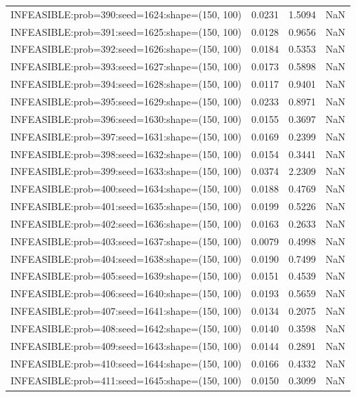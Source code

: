 \begin{longtable}{lccc}
INFEASIBLE:prob=390:seed=1624:shape=(150, 100) &   0.0231 &  1.5094 &    NaN \\
INFEASIBLE:prob=391:seed=1625:shape=(150, 100) &   0.0128 &  0.9656 &    NaN \\
INFEASIBLE:prob=392:seed=1626:shape=(150, 100) &   0.0184 &  0.5353 &    NaN \\
INFEASIBLE:prob=393:seed=1627:shape=(150, 100) &   0.0173 &  0.5898 &    NaN \\
INFEASIBLE:prob=394:seed=1628:shape=(150, 100) &   0.0117 &  0.9401 &    NaN \\
INFEASIBLE:prob=395:seed=1629:shape=(150, 100) &   0.0233 &  0.8971 &    NaN \\
INFEASIBLE:prob=396:seed=1630:shape=(150, 100) &   0.0155 &  0.3697 &    NaN \\
INFEASIBLE:prob=397:seed=1631:shape=(150, 100) &   0.0169 &  0.2399 &    NaN \\
INFEASIBLE:prob=398:seed=1632:shape=(150, 100) &   0.0154 &  0.3441 &    NaN \\
INFEASIBLE:prob=399:seed=1633:shape=(150, 100) &   0.0374 &  2.2309 &    NaN \\
INFEASIBLE:prob=400:seed=1634:shape=(150, 100) &   0.0188 &  0.4769 &    NaN \\
INFEASIBLE:prob=401:seed=1635:shape=(150, 100) &   0.0199 &  0.5226 &    NaN \\
INFEASIBLE:prob=402:seed=1636:shape=(150, 100) &   0.0163 &  0.2633 &    NaN \\
INFEASIBLE:prob=403:seed=1637:shape=(150, 100) &   0.0079 &  0.4998 &    NaN \\
INFEASIBLE:prob=404:seed=1638:shape=(150, 100) &   0.0190 &  0.7499 &    NaN \\
INFEASIBLE:prob=405:seed=1639:shape=(150, 100) &   0.0151 &  0.4539 &    NaN \\
INFEASIBLE:prob=406:seed=1640:shape=(150, 100) &   0.0193 &  0.5659 &    NaN \\
INFEASIBLE:prob=407:seed=1641:shape=(150, 100) &   0.0134 &  0.2075 &    NaN \\
INFEASIBLE:prob=408:seed=1642:shape=(150, 100) &   0.0140 &  0.3598 &    NaN \\
INFEASIBLE:prob=409:seed=1643:shape=(150, 100) &   0.0144 &  0.2891 &    NaN \\
INFEASIBLE:prob=410:seed=1644:shape=(150, 100) &   0.0166 &  0.4332 &    NaN \\
INFEASIBLE:prob=411:seed=1645:shape=(150, 100) &   0.0150 &  0.3099 &    NaN \\

\end{longtable}

